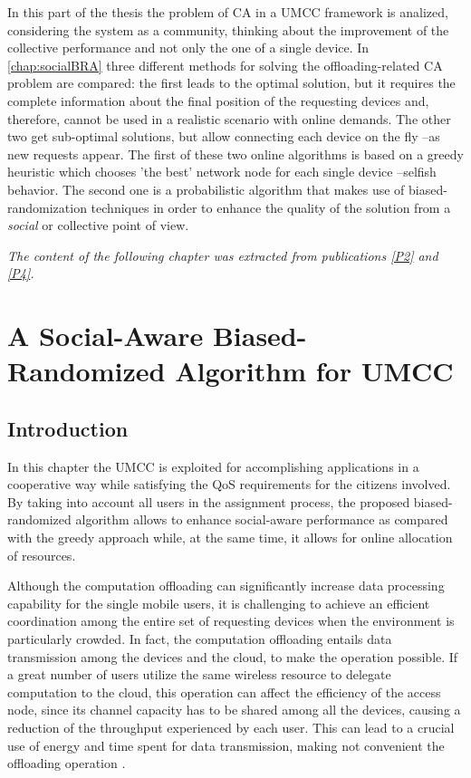 \documentclass[twoside,openright]{report}
\begin{document}
In this part of the thesis the problem of \gls{CA} in a \gls{UMCC} framework is analized, considering the system as a community, thinking about the improvement of the collective performance and not only the one of a single device.
In \autoref{chap:socialBRA} three different methods for solving the offloading-related \gls{CA} problem are compared: the first leads to the optimal solution, but it requires the complete information about the final position of the requesting devices and, therefore, cannot be used in a realistic scenario with online demands. The other two get sub-optimal solutions, but allow connecting each device on the fly --as new requests appear. The first of these two online algorithms is based on a greedy heuristic which chooses 'the best' network node for each single device --selfish behavior. The second one is a probabilistic algorithm that makes use of biased-randomization techniques \cite{Juan2011} in order to enhance the quality of the solution from a \emph{social} or collective point of view. 

\vspace{1cm}
\textit{The content of the following chapter was extracted from publications \hyperref[P2]{[P2]} and \hyperref[P4]{[P4]}.}

\chapter{A Social-Aware Biased-Randomized Algorithm for UMCC}
\label{chap:socialBRA}
\section{Introduction}
In this chapter the \gls{UMCC} is exploited for accomplishing applications in a cooperative way while satisfying the \gls{QoS} requirements for the citizens involved. 
By taking into account all users in the assignment process, the proposed biased-randomized algorithm allows to enhance social-aware performance as compared with the greedy approach while, at the same time, it allows for online allocation of resources.  

Although the computation offloading can significantly increase data processing capability for the single mobile users, it is challenging to achieve an efficient coordination among the entire set of requesting devices when the environment is particularly crowded. 
In fact, the computation offloading entails data transmission among the devices and the cloud, to make the operation possible. 
If a great number of users utilize the same wireless resource to delegate computation to the cloud, this operation can affect the efficiency of the access node, since its channel capacity has to be shared among all the devices, causing a reduction of the throughput experienced by each user. 
This can lead to a crucial use of energy and time spent for data transmission, making not convenient the offloading operation \cite{GameForMCC}.
\end{document}
